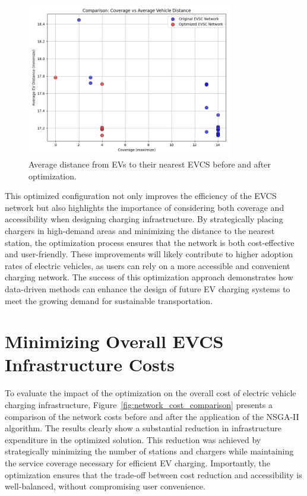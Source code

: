 \begin{figure}[h!]
\centering
\includegraphics[width=0.8\textwidth]{../Figures/distance.png}
\caption{Average distance from EVs to their nearest EVCS before and after optimization.}
\label{fig:plot_distance}
\end{figure}
\newpage

This optimized configuration not only improves the efficiency of the EVCS network but also highlights the importance of considering both coverage and accessibility when designing charging infrastructure. By strategically placing chargers in high-demand areas and minimizing the distance to the nearest station, the optimization process ensures that the network is both cost-effective and user-friendly. These improvements will likely contribute to higher adoption rates of electric vehicles, as users can rely on a more accessible and convenient charging network. The success of this optimization approach demonstrates how data-driven methods can enhance the design of future EV charging systems to meet the growing demand for sustainable transportation.





\section{Minimizing Overall EVCS Infrastructure Costs}

To evaluate the impact of the optimization on the overall cost of electric vehicle charging infrastructure, Figure~\ref{fig:network_cost_comparison} presents a comparison of the network costs before and after the application of the NSGA-II algorithm. The results clearly show a substantial reduction in infrastructure expenditure in the optimized solution. This reduction was achieved by strategically minimizing the number of stations and chargers while maintaining the service coverage necessary for efficient EV charging. Importantly, the optimization ensures that the trade-off between cost reduction and accessibility is well-balanced, without compromising user convenience.

